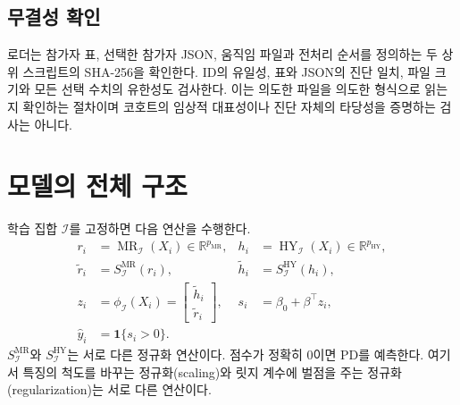\documentclass[11pt,a4paper]{article}
\newcommand{\R}{\mathbb{R}}
\newcommand{\ind}{\mathbf{1}}
\DeclareMathOperator{\MR}{MR}
\DeclareMathOperator{\HY}{HY}
\numberwithin{equation}{section}
\begin{document}
\subsection{무결성 확인}
로더는 참가자 표, 선택한 참가자 JSON, 움직임 파일과
전처리 순서를 정의하는 두 상위 스크립트의 SHA-256을 확인한다.
ID의 유일성, 표와 JSON의 진단 일치, 파일 크기와 모든 선택 수치의 유한성도 검사한다.
이는 의도한 파일을 의도한 형식으로 읽는지 확인하는 절차이며
코호트의 임상적 대표성이나 진단 자체의 타당성을 증명하는 검사는 아니다.

\section{모델의 전체 구조}
학습 집합 \(\mathcal I\)를 고정하면 다음 연산을 수행한다.
\begin{align}
 r_i&=\MR_{\mathcal I}(X_i)\in\R^{p_{\MR}},&
 h_i&=\HY_{\mathcal I}(X_i)\in\R^{p_{\HY}},\\
 \widetilde r_i&=S^{\MR}_{\mathcal I}(r_i),&
 \widetilde h_i&=S^{\HY}_{\mathcal I}(h_i),\\
 z_i&=\phi_{\mathcal I}(X_i)
 =\begin{bmatrix}\widetilde h_i\\\widetilde r_i\end{bmatrix},&
 s_i&=\beta_0+\beta^\top z_i,\\
 \widehat y_i&=\ind\{s_i>0\}.&&
\end{align}
\(S^{\MR}_{\mathcal I}\)와 \(S^{\HY}_{\mathcal I}\)는 서로 다른 정규화 연산이다.
점수가 정확히 \(0\)이면 PD를 예측한다.
여기서 특징의 척도를 바꾸는 정규화(scaling)와
릿지 계수에 벌점을 주는 정규화(regularization)는 서로 다른 연산이다.
\end{document}
